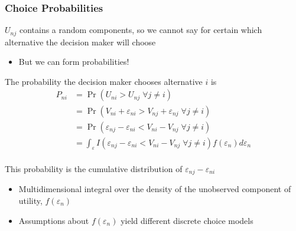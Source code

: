 \documentclass{beamer}\usepackage[]{graphicx}\usepackage[]{color}
\begin{document}
\begin{frame}\frametitle{Choice Probabilities}
    $U_{nj}$ contains a random components, so we cannot say for certain which alternative the decision maker will choose
    \begin{itemize}
    	\item But we can form probabilities!
    \end{itemize}
    \vspace{1ex}
    The probability the decision maker chooses alternative $i$ is
    \begin{align*}
    	P_{ni} &= \Pr(U_{ni} > U_{nj} \; \forall j \neq i) \\
    	&= \Pr(V_{ni} + \varepsilon_{ni} > V_{nj} + \varepsilon_{nj} \; \forall j \neq i) \\
    	&= \Pr(\varepsilon_{nj} - \varepsilon_{ni} < V_{ni} - V_{nj} \; \forall j \neq i) \\
    	&= \int_\varepsilon I(\varepsilon_{nj} - \varepsilon_{ni} < V_{ni} - V_{nj} \; \forall j \neq i) f(\varepsilon_n) d\varepsilon_n
    \end{align*} \\
    \vspace{1ex}
    This probability is the cumulative distribution of $\varepsilon_{nj} - \varepsilon_{ni}$
    \begin{itemize}
    	\item Multidimensional integral over the density of the unobserved component of utility, $f(\varepsilon_n)$
    	\item Assumptions about $f(\varepsilon_n)$ yield different discrete choice models
    \end{itemize}
\end{frame}
\end{document}

